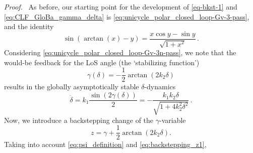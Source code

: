 \documentclass[journal,twoside,web]{ieeecolor}
\theoremstyle{definition}
\renewenvironment{proof}[1][Proof]{\par\pushQED{\qed}\normalfont\textit{#1.}~}{\popQED\par}
\begin{document}
\begin{proof}
As before, our starting point for the development of \eqref{eq-bkst-1} and \eqref{eq:CLF_GloBa_gamma_delta} is \eqref{eq:unicycle_polar_closed_loop-Gv-3-pass}, and 
 the identity
\begin{equation}
\sin(\arctan(x)-y) = \frac{x\cos y - \sin y}{\sqrt{1+x^2}}\,.
\end{equation}
Considering \eqref{eq:unicycle_polar_closed_loop-Gv-3n-pass}, 
we note that the would-be feedback for the LoS angle (the `stabilizing function')
\begin{equation}
\gamma(\delta) = -\frac{1}{2} \arctan(2k_2\delta) %
\end{equation}
results in the globally asymptotically stable $\delta$-dynamics
\begin{equation}
\dot{\delta} = k_1\frac{\sin(2\gamma(\delta))}{2} 
= - \frac{k_1 k_2 \delta}{\sqrt{1+4 k_2 ^2\delta^2}}\,.
\end{equation}
Now, we introduce a backstepping change of the $\gamma$-variable
\begin{equation}\label{eq:backstepping_z1}
 z = \gamma + \frac{1}{2}\arctan(2 k_2 \delta).
\end{equation}
Taking into account \eqref{eq:psi_definition} and \eqref{eq:backstepping_z1}, 

\end{proof}
\end{document}
